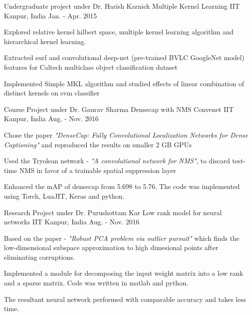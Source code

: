 \begin{cventries}
	
	\cventry
	{Undergraduate project under Dr. Harish Karnick} %
	{Multiple Kernel Learning} %
	{IIT Kanpur, India} %
	{Jan. - Apr. 2015} %
	{
		\begin{cvitems} %
			 \item {Explored relative kernel hilbert space, multiple kernel learning algorithm and hierarchical kernel learning.}
			 \item {Extracted surf and convolutional deep-net (pre-trained BVLC GoogleNet model) features for Caltech multiclass object classification dataset}
			 \item {Implemented Simple MKL algorithm and studied effects of linear combination of distinct kernels on svm classifier}
		\end{cvitems}
	}
	
	\cventry
	{Course Project under Dr. Gaurav Sharma} %
	{Densecap with NMS Convenet} %
	{IIT Kanpur, India} %
	{Aug. - Nov. 2016} %
	{
		\begin{cvitems} %
			\item {Chose the paper \textit{"DenseCap: Fully Convolutional Localization Networks for Dense Captioning"} and reproduced the results on smaller 2 GB GPUs}
			\item Used the Tryolean network - \textit{ "A convolutional network for NMS"}, to discard test-time NMS in favor of a trainable spatial suppression layer
			\item Enhanced the mAP of densecap from 5.698 to 5.76. The code was implemented using Torch, LuaJIT, Keras and python. 
		\end{cvitems}
	}
	
	\cventry
	{Research Project under Dr. Purushottam Kar} %
	{Low rank model for neural networks} %
	{IIT Kanpur, India} %
	{Aug. - Nov. 2016} %
	{
		\begin{cvitems} %
			\item { 
				Based on the paper - \textit{"Robust PCA problem via outlier pursuit"} which finds the low-dimensional subspace approximation to high dimesional points after eliminating corruptions.
				}
			\item { 
				Implemented a module for decomposing the input weight matrix into a low rank and a sparse matrix. Code was written in matlab and python.
			}
			\item {
				The resultant neural network performed with comparable accuracy and takes less time.
			}
		\end{cvitems}
	}


\end{cventries}
